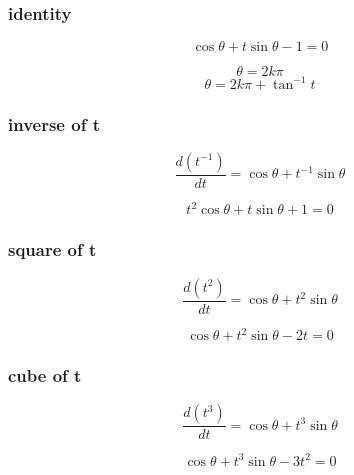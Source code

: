 \documentclass{article}
\begin{document}
\subsubsection{identity}

\begin{equation}
    \cos \theta + t \sin \theta - 1 = 0
\end{equation}

\begin{equation}
    \theta = 2k\pi
\end{equation}
\begin{equation}
    \theta = 2k\pi + \tan^{-1} t
\end{equation}

\subsubsection{inverse of t}

\begin{equation}
    \frac{d(t^{-1})}{dt} = \cos \theta + t^{-1} \sin \theta
\end{equation}

\begin{equation}
    t^2 \cos \theta + t \sin \theta + 1 = 0
\end{equation}

\subsubsection{square of t}

\begin{equation}
    \frac{d(t^2)}{dt} = \cos \theta + t^2 \sin \theta
\end{equation}

\begin{equation}
    \cos \theta + t^2 \sin \theta - 2 t = 0
\end{equation}

\subsubsection{cube of t}

\begin{equation}
    \frac{d(t^3)}{dt} = \cos \theta + t^3 \sin \theta
\end{equation}

\begin{equation}
    \cos \theta + t^3 \sin \theta - 3 t^2 = 0
\end{equation}
\end{document}

